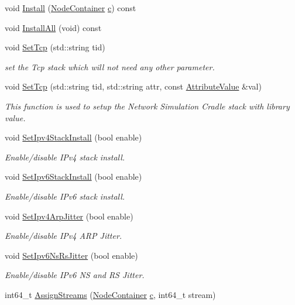 \begin{DoxyCompactItemize}
\item 
void \hyperlink{classns3_1_1InternetStackHelper_a3575bfbaafc7b35b107d8ac8abad57b5}{Install} (\hyperlink{classns3_1_1NodeContainer}{Node\+Container} \hyperlink{mmwave_2model_2fading-traces_2fading__trace__generator_8m_ae0323a9039add2978bf5b49550572c7c}{c}) const 
\item 
void \hyperlink{classns3_1_1InternetStackHelper_a6cfa73782fd4071c4cfbd73ebf1bbb44}{Install\+All} (void) const 
\item 
void \hyperlink{classns3_1_1InternetStackHelper_ac76e9cf493ef559f311c4ef85945129f}{Set\+Tcp} (std\+::string tid)
\begin{DoxyCompactList}\small\item\em set the Tcp stack which will not need any other parameter. \end{DoxyCompactList}\item 
void \hyperlink{classns3_1_1InternetStackHelper_a665afc046449275066145dcfa2f5790e}{Set\+Tcp} (std\+::string tid, std\+::string attr, const \hyperlink{classns3_1_1AttributeValue}{Attribute\+Value} \&val)
\begin{DoxyCompactList}\small\item\em This function is used to setup the Network Simulation Cradle stack with library value. \end{DoxyCompactList}\item 
void \hyperlink{classns3_1_1InternetStackHelper_a10e2a35f410d0d1c90d979542c8bfd6e}{Set\+Ipv4\+Stack\+Install} (bool enable)
\begin{DoxyCompactList}\small\item\em Enable/disable I\+Pv4 stack install. \end{DoxyCompactList}\item 
void \hyperlink{classns3_1_1InternetStackHelper_a5fa8d34e5834305b6aa1b0fe43e1132b}{Set\+Ipv6\+Stack\+Install} (bool enable)
\begin{DoxyCompactList}\small\item\em Enable/disable I\+Pv6 stack install. \end{DoxyCompactList}\item 
void \hyperlink{classns3_1_1InternetStackHelper_a24eb534b7da530992ed34b9c620bcc8a}{Set\+Ipv4\+Arp\+Jitter} (bool enable)
\begin{DoxyCompactList}\small\item\em Enable/disable I\+Pv4 A\+RP Jitter. \end{DoxyCompactList}\item 
void \hyperlink{classns3_1_1InternetStackHelper_a82214073afab2b64fe89ca60b8238e6b}{Set\+Ipv6\+Ns\+Rs\+Jitter} (bool enable)
\begin{DoxyCompactList}\small\item\em Enable/disable I\+Pv6 NS and RS Jitter. \end{DoxyCompactList}\item 
int64\+\_\+t \hyperlink{classns3_1_1InternetStackHelper_a63c904e832a2f17e036338db4aa2f1b8}{Assign\+Streams} (\hyperlink{classns3_1_1NodeContainer}{Node\+Container} \hyperlink{mmwave_2model_2fading-traces_2fading__trace__generator_8m_ae0323a9039add2978bf5b49550572c7c}{c}, int64\+\_\+t stream)
\end{DoxyCompactItemize}
